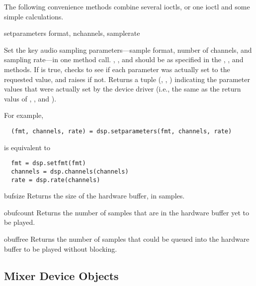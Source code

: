 The following convenience methods combine several ioctls, or one ioctl
and some simple calculations.

\begin{methoddesc}{setparameters}
  {format, nchannels, samplerate }

Set the key audio sampling parameters---sample format, number of
channels, and sampling rate---in one method call.  , 
, and  should be as specified in the
, , and  
methods.  If  is true,  checks to
see if each parameter was actually set to the requested value, and
raises  if not.  Returns a tuple (,
, ) indicating the parameter values that
were actually set by the device driver (i.e., the same as the return
valus of , , and ).

For example,
\begin{verbatim}
  (fmt, channels, rate) = dsp.setparameters(fmt, channels, rate)
\end{verbatim}
is equivalent to
\begin{verbatim}
  fmt = dsp.setfmt(fmt)
  channels = dsp.channels(channels)
  rate = dsp.rate(channels)
\end{verbatim}
\end{methoddesc}

\begin{methoddesc}{bufsize}{}
Returns the size of the hardware buffer, in samples.
\end{methoddesc}

\begin{methoddesc}{obufcount}{}
Returns the number of samples that are in the hardware buffer yet to be
played.
\end{methoddesc}

\begin{methoddesc}{obuffree}{}
Returns the number of samples that could be queued into the hardware
buffer to be played without blocking.
\end{methoddesc}

\subsection{Mixer Device Objects \label{mixer-device-objects}}

